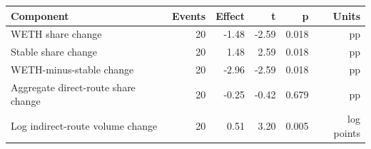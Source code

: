 \begin{tabular}{lrrrrr}
\toprule
Component & Events & Effect & t & p & Units \\
\midrule
WETH share change & 20 & -1.48 & -2.59 & 0.018 & pp \\
Stable share change & 20 & 1.48 & 2.59 & 0.018 & pp \\
WETH-minus-stable change & 20 & -2.96 & -2.59 & 0.018 & pp \\
Aggregate direct-route share change & 20 & -0.25 & -0.42 & 0.679 & pp \\
Log indirect-route volume change & 20 & 0.51 & 3.20 & 0.005 & log points \\
\bottomrule
\end{tabular}
